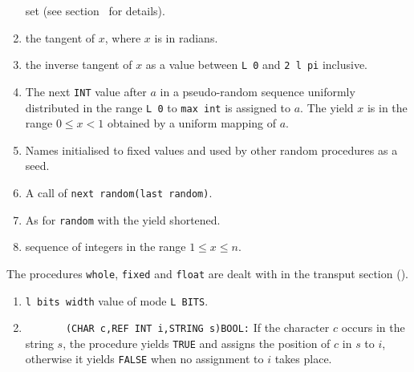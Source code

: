 \begin{enumerate}
set (see section~ for details).
\item {}\newline
{} the tangent of $x$, where $x$ is in radians.
\item {}
\newline
{} the inverse tangent of $x$ as a value
between \verb|L 0| and \verb|2 l pi| inclusive.
\item {} \newline
The next \verb|INT| value after $a$ in a pseudo-random sequence
uniformly distributed in the range \verb|L 0| to \verb|max int| is
assigned to $a$. The yield $x$ is in the range $0\leq x<1$ obtained by
a uniform mapping of $a$.
\item {} \newline
{} \newline
Names initialised to fixed values and used by other random procedures
as a seed.
\item {} \newline
A call of \verb|next random(last random)|.
\item {}\newline
As for \verb|random| with the yield shortened.
\item {}\newline
{} 
 sequence of 
integers in the range $1\leq x\leq n$.
\end{enumerate}

The procedures \verb|whole|, \verb|fixed| and \verb|float| are
dealt with in the transput section ().
\begin{enumerate}
\item {}\newline
{} \verb|l bits width|
 
 value of mode \verb|L BITS|.
\item {}\newline
      \verb|       (CHAR c,REF INT i,STRING s)BOOL:|\newline
If the character $c$ occurs in the string $s$, the procedure yields
\verb|TRUE| and assigns the position of $c$ in $s$ to $i$, otherwise it
yields \verb|FALSE| when no assignment to $i$ takes place.
\end{enumerate}

